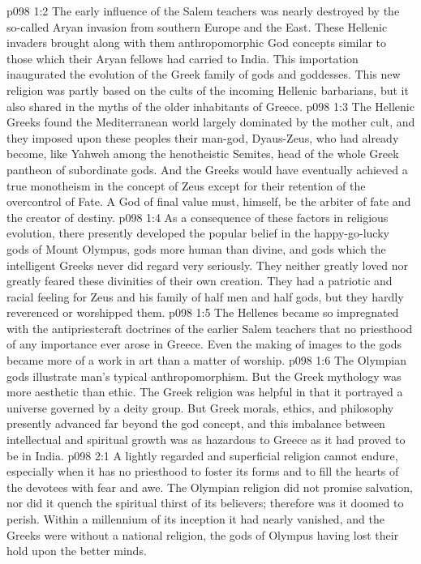 \vs p098 1:2 The early influence of the Salem teachers was nearly destroyed by the so\hyp{}called Aryan invasion from southern Europe and the East. These Hellenic invaders brought along with them anthropomorphic God concepts similar to those which their Aryan fellows had carried to India. This importation inaugurated the evolution of the Greek family of gods and goddesses. This new religion was partly based on the cults of the incoming Hellenic barbarians, but it also shared in the myths of the older inhabitants of Greece.
\vs p098 1:3 The Hellenic Greeks found the Mediterranean world largely dominated by the mother cult, and they imposed upon these peoples their man\hyp{}god, Dyaus\hyp{}Zeus, who had already become, like Yahweh among the henotheistic Semites, head of the whole Greek pantheon of subordinate gods. And the Greeks would have eventually achieved a true monotheism in the concept of Zeus except for their retention of the overcontrol of Fate. A God of final value must, himself, be the arbiter of fate and the creator of destiny.
\vs p098 1:4 As a consequence of these factors in religious evolution, there presently developed the popular belief in the happy\hyp{}go\hyp{}lucky gods of Mount Olympus, gods more human than divine, and gods which the intelligent Greeks never did regard very seriously. They neither greatly loved nor greatly feared these divinities of their own creation. They had a patriotic and racial feeling for Zeus and his family of half men and half gods, but they hardly reverenced or worshipped them.
\vs p098 1:5 The Hellenes became so impregnated with the antipriestcraft doctrines of the earlier Salem teachers that no priesthood of any importance ever arose in Greece. Even the making of images to the gods became more of a work in art than a matter of worship.
\vs p098 1:6 The Olympian gods illustrate man’s typical anthropomorphism. But the Greek mythology was more aesthetic than ethic. The Greek religion was helpful in that it portrayed a universe governed by a deity group. But Greek morals, ethics, and philosophy presently advanced far beyond the god concept, and this imbalance between intellectual and spiritual growth was as hazardous to Greece as it had proved to be in India.
\vs p098 2:1 A lightly regarded and superficial religion cannot endure, especially when it has no priesthood to foster its forms and to fill the hearts of the devotees with fear and awe. The Olympian religion did not promise salvation, nor did it quench the spiritual thirst of its believers; therefore was it doomed to perish. Within a millennium of its inception it had nearly vanished, and the Greeks were without a national religion, the gods of Olympus having lost their hold upon the better minds.
